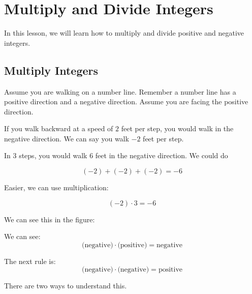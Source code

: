 
\section{Multiply and Divide Integers}
\thispagestyle{fancy}
In this lesson, we will learn how to multiply and divide positive and negative integers.

\subsection{Multiply Integers}
Assume you are walking on a number line. Remember a number line has a positive direction and a negative direction. Assume you are facing the positive direction.

If you walk backward at a speed of $2$ feet per step, you would walk in the negative direction. We can say you walk $-2$ feet per step.

In $3$ steps, you would walk $6$ feet in the negative direction. We could do

\[ (-2)+(-2)+(-2)=-6 \]

Easier, we can use multiplication:

\[ (-2)\cdot3=-6 \]

We can see this in the figure:

		\begin{tightcenter}
		\end{tightcenter}

We can see:
\[ \text{(negative)}\cdot\text{(positive)}=\text{negative} \]

The next rule is:
\[ \text{(negative)}\cdot\text{(negative)}=\text{positive} \]

There are two ways to understand this.

